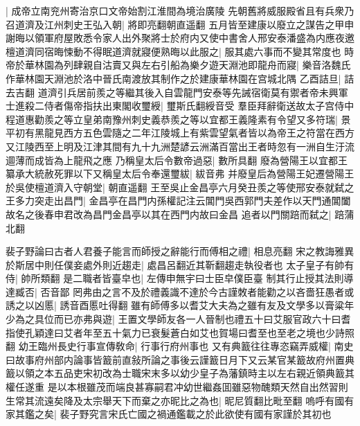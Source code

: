 |{
	成帝立南兖州寄治京口文帝始割江淮間為境治廣陵}
先朝舊將威服殿省且有兵衆乃召道濟及江州刺史王弘入朝|{
	將即亮翻朝直遥翻}
五月皆至建康以廢立之謀告之甲申謝晦以領軍府屋敗悉令家人出外聚將士於府内又使中書舍人邢安泰潘盛為内應夜邀檀道濟同宿晦悚動不得眠道濟就寢便熟晦以此服之|{
	服其處六事而不變其常度也}
時帝於華林園為列肆親自沽賣又與左右引船為樂夕遊天淵池即龍舟而寢|{
	樂音洛魏氏作華林園天淵池於洛中晉氏南渡放其制作之於建康華林園在宫城北隅}
乙酉詰旦|{
	詰去吉翻}
道濟引兵居前羨之等繼其後入自雲龍門安泰等先誡宿衛莫有禦者帝未興軍士進殺二侍者傷帝指扶出東閣收璽綬|{
	璽斯氏翻綬音受}
羣臣拜辭衛送故太子宫侍中程道惠勸羨之等立皇弟南豫州刺史義恭羨之等以宜都王義隆素有令望又多符瑞|{
	景平初有黑龍見西方五色雲隨之二年江陵城上有紫雲望氣者皆以為帝王之符當在西方又江陵西至上明及江津其間有九十九洲楚諺云洲滿百當出王者時忽有一洲自生汙流逥薄而成皆為上龍飛之應}
乃稱皇太后令數帝過惡|{
	數所具翻}
廢為營陽王以宜都王纂承大統赦死罪以下又稱皇太后令奉還璽紱|{
	紱音弗}
并廢皇后為營陽王妃遷營陽王於吳使檀道濟入守朝堂|{
	朝直遥翻}
王至吳止金昌亭六月癸丑羨之等使邢安泰就弑之王多力突走出昌門|{
	金昌亭在昌門内孫權記注云閶門吳西郭門夫差作以天門通閶闔故名之後春申君改為昌門金昌亭以其在西門内故曰金昌}
追者以門關踣而弑之|{
	踣蒲北翻}


裴子野論曰古者人君養子能言而師授之辭能行而傅相之禮|{
	相息亮翻}
宋之教誨雅異於斯居中則任僕妾處外則近趨走|{
	處昌呂翻近其靳翻趨走執役者也}
太子皇子有帥有侍|{
	帥所類翻}
是二職者皆臺皁也|{
	左傳申無宇曰士臣皁僕臣臺}
制其行止授其法則導達臧否|{
	否音鄙}
罔弗由之言不及於禮義識不達於今古謹敇者能勸之以吝嗇狂愚者或誘之以凶慝|{
	誘音酉慝吐得翻}
雖有師傅多以耆艾大夫為之雖有友及文學多以膏粱年少為之具位而已亦弗與遊|{
	王置文學師友各一人晉制也禮五十曰艾服官政六十曰耆指使孔穎達曰艾者年至五十氣力已衰髮蒼白如艾也賀場曰耆至也至老之境也少詩照翻}
幼王臨州長史行事宣傳敎命|{
	行事行府州事也}
又有典籖往往專恣竊弄威權|{
	南史曰故事府州部内論事皆籖前直敍所論之事後云謹籖日月下又云某官某籖故府州置典籖以領之本五品吏宋初改為士職宋末多以幼少皇子為藩鎮時主以左右親近領典籖其權任遂重}
是以本根雖茂而端良甚寡嗣君冲幼世繼姦囬雖惡物醜類天然自出然習則生常其流遠矣降及太宗舉天下而棄之亦昵比之為也|{
	昵尼質翻比毗至翻}
嗚呼有國有家其鑑之矣|{
	裴子野究言宋氏亡國之禍通鑑載之於此欲使有國有家謹於其初也}


